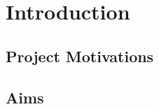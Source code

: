 \documentclass{l4proj}
\begin{document}
%
%
%
%
%
%
%
\chapter{Introduction}



\section{Project Motivations}


\section{Aims}
 
\end{document}
